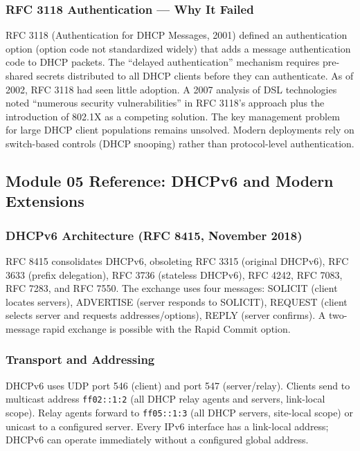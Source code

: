 \documentclass[11pt,letterpaper]{article}
\begin{document}
\subsubsection{RFC 3118 Authentication --- Why It Failed}

RFC 3118 (Authentication for DHCP Messages, 2001) defined an authentication option (option code not standardized widely) that adds a message authentication code to DHCP packets. The ``delayed authentication'' mechanism requires pre-shared secrets distributed to all DHCP clients before they can authenticate. As of 2002, RFC 3118 had seen little adoption. A 2007 analysis of DSL technologies noted ``numerous security vulnerabilities'' in RFC 3118's approach plus the introduction of 802.1X as a competing solution. The key management problem for large DHCP client populations remains unsolved. Modern deployments rely on switch-based controls (DHCP snooping) rather than protocol-level authentication.

\subsection{Module 05 Reference: DHCPv6 and Modern Extensions}

\subsubsection{DHCPv6 Architecture (RFC 8415, November 2018)}

RFC 8415 consolidates DHCPv6, obsoleting RFC 3315 (original DHCPv6), RFC 3633 (prefix delegation), RFC 3736 (stateless DHCPv6), RFC 4242, RFC 7083, RFC 7283, and RFC 7550. The exchange uses four messages: SOLICIT (client locates servers), ADVERTISE (server responds to SOLICIT), REQUEST (client selects server and requests addresses/options), REPLY (server confirms). A two-message rapid exchange is possible with the Rapid Commit option.

\subsubsection{Transport and Addressing}

DHCPv6 uses UDP port 546 (client) and port 547 (server/relay). Clients send to multicast address \texttt{ff02::1:2} (all DHCP relay agents and servers, link-local scope). Relay agents forward to \texttt{ff05::1:3} (all DHCP servers, site-local scope) or unicast to a configured server. Every IPv6 interface has a link-local address; DHCPv6 can operate immediately without a configured global address.
\end{document}
